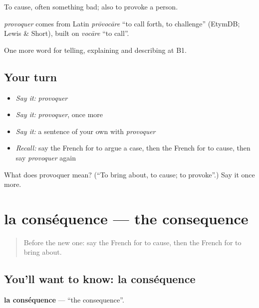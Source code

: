 To cause, often something bad; also to provoke a person.

\begin{cousinweb}
\emph{provoquer} comes from Latin \emph{prōvocāre} \textquotedblleft{}to call forth, to challenge\textquotedblright{} (EtymDB; Lewis \& Short), built on \emph{vocāre} \textquotedblleft{}to call\textquotedblright{}.
\end{cousinweb}

\begin{grammarlens}[title={What you've built}]
One more word for telling, explaining and describing at B1.
\end{grammarlens}

\subsection*{Your turn}
\begin{itemize}
\raggedright
  \item \emph{Say it:} \emph{provoquer}
  \item \emph{Say it:} \emph{provoquer}, once more
  \item \emph{Say it:} a sentence of your own with \emph{provoquer}
  \item \emph{Recall:} say the French for to argue a case, then the French for to cause, then say \emph{provoquer} again
\end{itemize}

\begin{tcolorbox}[breakable,colback=teal!4,colframe=teal!35!black,title={Before you move on}]
What does provoquer mean? (\textquotedblleft{}To bring about, to cause; to provoke\textquotedblright{}.) Say it once more.
\end{tcolorbox}
\section[la conséquence]{la conséquence — the consequence}

\label{lesson:FR-C346-consequence}



\begin{quote}
Before the new one: say the French for to cause, then the French for to bring about.
\end{quote}

\subsection*{You'll want to know: la conséquence}
\textbf{la conséquence} — \textquotedblleft{}the consequence\textquotedblright{}.

